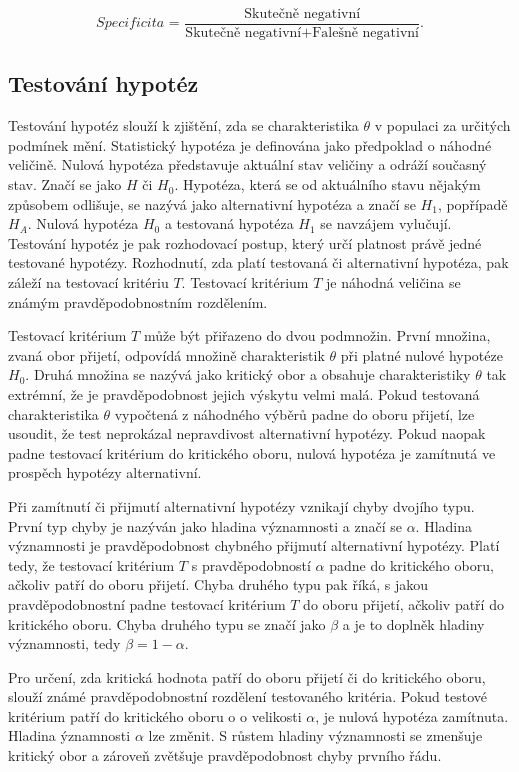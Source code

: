 \begin{equation}
    \textit{Specificita = } \frac{\text{Skutečně negativní}}{\text{Skutečně negativní} + \text{Falešně negativní}}.
\end{equation}

\subsection{Testování hypotéz}
Testování hypotéz slouží k zjištění, zda se charakteristika $\theta$ v populaci za určitých podmínek mění. Statistický hypotéza
je definována jako předpoklad o náhodné veličině. Nulová hypotéza představuje aktuální stav veličiny a odráží současný stav.
Značí se jako $H$ či $H_0$. Hypotéza, která se od aktuálního stavu nějakým způsobem odlišuje, se nazývá jako alternativní hypotéza
a značí se $H_1$, popřípadě $H_A$. Nulová hypotéza $H_0$ a testovaná hypotéza $H_1$ se navzájem vylučují. Testování hypotéz je
pak rozhodovací postup, který určí platnost právě jedné testované hypotézy. Rozhodnutí, zda platí testovaná či alternativní hypotéza,
pak záleží na testovací kritériu $T$. Testovací kritérium $T$ je náhodná veličina se známým pravděpodobnostním rozdělením.

Testovací kritérium $T$ může být přiřazeno do dvou podmnožin. První množina, zvaná obor přijetí, odpovídá množině charakteristik $\theta$
při platné nulové hypotéze $H_0$. Druhá množina se nazývá jako kritický obor a obsahuje charakteristiky $\theta$ tak extrémní, že je 
pravděpodobnost jejich výskytu velmi malá. Pokud testovaná charakteristika $\theta$ vypočtená z náhodného výběrů padne do oboru přijetí,
lze usoudit, že test neprokázal nepravdivost alternativní hypotézy. Pokud naopak padne testovací kritérium do kritického oboru, nulová
hypotéza je zamítnutá ve prospěch hypotézy alternativní.

Při zamítnutí či přijmutí alternativní hypotézy vznikají chyby dvojího typu. První typ chyby je nazýván jako hladina významnosti a značí
se $\alpha$. Hladina významnosti je pravděpodobnost chybného přijmutí alternativní hypotézy. Platí tedy, že testovací kritérium $T$ 
s pravděpodobností $\alpha$ padne do kritického oboru, ačkoliv patří do oboru přijetí. Chyba druhého typu pak říká, s jakou pravděpodobnostní
padne testovací kritérium $T$ do oboru přijetí, ačkoliv patří do kritického oboru. Chyba druhého typu se značí jako $\beta$ a je to doplněk
hladiny významnosti, tedy $\beta = 1 - \alpha$.

Pro určení, zda kritická hodnota patří do oboru přijetí či do kritického oboru, slouží známé pravděpodobnostní rozdělení testovaného kritéria.
Pokud testové kritérium patří do kritického oboru o o velikosti $\alpha$, je nulová hypotéza zamítnuta. Hladina ýznamnosti $\alpha$ lze změnit.
S růstem hladiny významnosti se zmenšuje kritický obor a zároveň zvětšuje pravděpodobnost chyby prvního řádu.
\cite{hebak_praktikum_2009}

